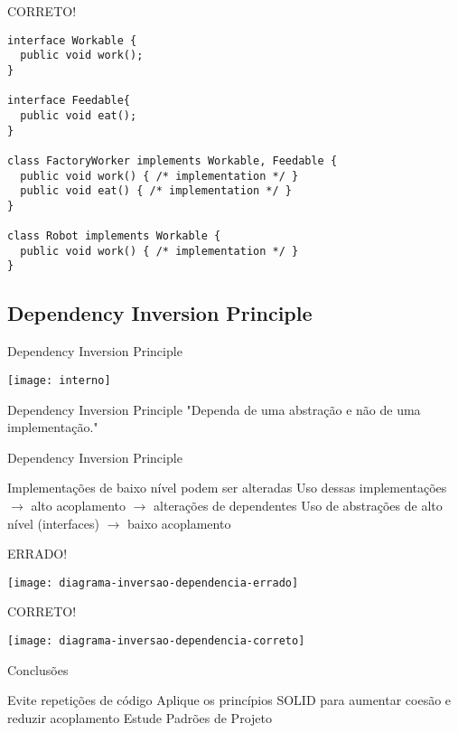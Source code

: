 \documentclass{beamer}
\begin{document}
\begin{frame}[fragile]{CORRETO!}
 \begin{verbatim}
interface Workable {
  public void work();
}

interface Feedable{
  public void eat();
}

class FactoryWorker implements Workable, Feedable {
  public void work() { /* implementation */ }
  public void eat() { /* implementation */ }
}

class Robot implements Workable {
  public void work() { /* implementation */ }
}
  \end{verbatim}
\end{frame}

\subsection{Dependency Inversion Principle}

\begin{frame}{Dependency Inversion Principle}
  \begin{center}
    \texttt{[image: interno]}
  \end{center}
\end{frame}

\begin{frame}{Dependency Inversion Principle}
 "Dependa de uma abstração e não de uma implementação."
\end{frame}

\begin{frame}{Dependency Inversion Principle}
 \begin{outline}
   Implementações de baixo nível podem ser alteradas
   Uso dessas implementações $\rightarrow$ alto acoplamento $\rightarrow$ alterações de dependentes
   Uso de abstrações de alto nível (interfaces) $\rightarrow$ baixo acoplamento
 \end{outline}
\end{frame}

\begin{frame}{ERRADO!}
  \begin{center}
    \texttt{[image: diagrama-inversao-dependencia-errado]}
  \end{center}
\end{frame}

\begin{frame}{CORRETO!}
  \begin{center}
    \texttt{[image: diagrama-inversao-dependencia-correto]}
  \end{center}
\end{frame}

\begin{frame}{Conclusões}
  \begin{outline}
     Evite \alert{repetições} de código
     Aplique os princípios SOLID para \alert{aumentar coesão} e \alert{reduzir acoplamento}
     Estude \alert{Padrões de Projeto}
  \end{outline}
\end{frame}
\end{document}
